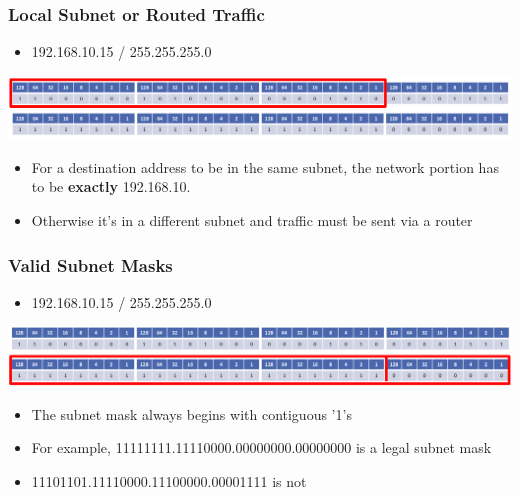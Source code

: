 \documentclass[pdflatex,compress]{beamer}
\begin{document}
\begin{frame}
	\frametitle{Local Subnet or Routed Traffic}
	\begin{itemize}
		\item 192.168.10.15 / 255.255.255.0
	\end{itemize}
	\begin{center}
		\includegraphics[width=\linewidth]{img/img26}
	\end{center}
	\begin{itemize}
		\item For a destination address to be in the same subnet, the network portion has to be \textbf{exactly} 192.168.10.
		\item Otherwise it's in a different subnet and traffic must be sent via a router
	\end{itemize}
\end{frame}

\begin{frame}
	\frametitle{Valid Subnet Masks}
	\begin{itemize}
		\item 192.168.10.15 / 255.255.255.0
	\end{itemize}
	\begin{center}
		\includegraphics[width=\linewidth]{img/img27}
	\end{center}
	\begin{itemize}
		\item The subnet mask always begins with contiguous '1's
		\item For example, 11111111.11110000.00000000.00000000 is a legal subnet mask
		\item 11101101.11110000.11100000.00001111 is not
	\end{itemize}
\end{frame}
\end{document}
